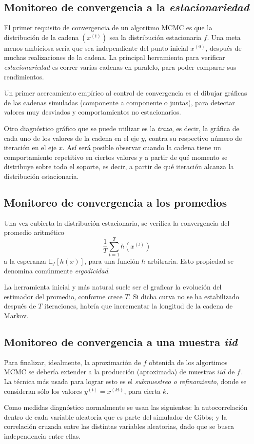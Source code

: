 \subsection{Monitoreo de convergencia a la \textit{estacionariedad}}

El primer requisito de convergencia de un algoritmo MCMC es que la distribución de la cadena $(x^{(t)})$ sea la distribución estacionaria $f$. Una meta menos ambiciosa sería que sea independiente del punto inicial $x^{(0)}$, después de muchas realizaciones de la cadena. La principal herramienta para verificar \textit{estacionariedad} es correr varias cadenas en paralelo, para poder comparar sus rendimientos. 

Un primer acercamiento empírico al control de convergencia es el dibujar gráficas de las cadenas simuladas (componente a componente o juntas), para detectar valores muy desviados y comportamientos no estacionarios. 

Otro diagnóstico gráfico que se puede utilizar es la \textit{traza}, es decir, la gr\'afica de cada uno de los valores de la cadena en el eje $y$, contra su respectivo n\'umero de iteraci\'on en el eje $x$. As\'i ser\'a posible observar cuando la cadena tiene un comportamiento repetitivo en ciertos valores y a partir de qu\'e momento se distribuye sobre todo el soporte, es decir, a partir de qu\'e iteraci\'on alcanza la distribuci\'on estacionaria. 

\subsection{Monitoreo de convergencia a los promedios}

Una vez cubierta la distribución estacionaria, se verifica la convergencia del promedio aritmético
\begin{equation*}
    \frac{1}{T}\sum_{t=1}^T h(x^{(t)})
\end{equation*}
a la esperanza $\mathbb{E}_f[h(x)]$, para una función $h$ arbitraria. Esto propiedad se denomina com\'unmente \textit{ergodicidad}.

La herramienta inicial y más natural suele ser el graficar la evolución del estimador del promedio, conforme crece $T$. Si dicha curva no se ha estabilizado después de $T$ iteraciones, habría que incrementar la longitud de la cadena de Markov.

\subsection{Monitoreo de convergencia a una muestra \textit{iid}}

Para finalizar, idealmente, la aproximación de $f$ obtenida de los algortimos MCMC se debería extender a la producción (aproximada) de muestras $iid$ de $f$. La técnica más usada para lograr esto es el \textit{submuestreo o refinamiento}, donde se consideran s\'olo los valores $y^{(t)} = x^{(kt)}$, para cierta $k$.

Como medidas diagn\'ostico normalmente se usan las siguientes: la autocorrelaci\'on dentro de cada variable aleatoria que es parte del simulador de Gibbs; y la correlaci\'on cruzada entre las distintas variables aleatorias, dado que se busca independencia entre ellas.

\newpage